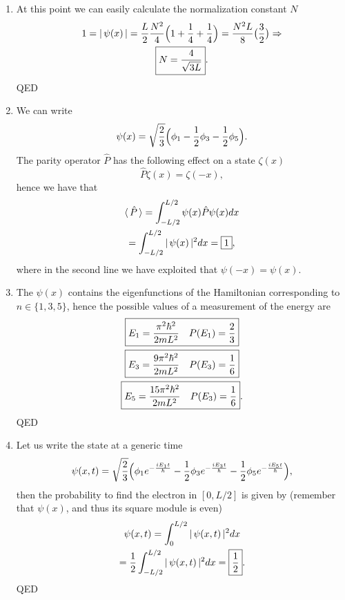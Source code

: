 \begin{enumerate}
    \item At this point we can easily calculate the normalization constant $N$
    \begin{gather}
        1 = |\, \psi (x) \,| = \frac{L}{2} \frac{N^2}{4} \Bigl( 1 + \frac{1}{4} + \frac{1}{4} \Bigr) = \frac{N^2 L}{8} \bigl( \frac{3}{2} \bigr) \Rightarrow \notag \\
        \boxed{N = \frac{4}{\sqrt{3 L}}}.
    \end{gather}
    QED 
    \item We can write 
    \begin{equation}
        \psi (x) = \sqrt{\frac{2}{3}} \Bigl( \phi_1 - \frac{1}{2} \phi_3 - \frac{1}{2} \phi_5 \Bigr).
    \end{equation}
    The parity operator $\hat{P}$ has the following effect on a state $\zeta(x)$
    \begin{equation}
        \hat{P} \zeta(x) = \zeta(-x),
    \end{equation}
    hence we have that
    \begin{gather}
        \langle \, \hat{P} \, \rangle = \int_{-L/2}^{L/2} \psi(x) \hat{P} \psi(x) dx \notag \\
        =  \int_{-L/2}^{L/2} |\, \psi(x) \,|^2 dx = \boxed{1},
    \end{gather}
    where in the second line we have exploited that $\psi(-x) = \psi(x)$.
    \item The $\psi(x)$ contains the eigenfunctions of the Hamiltonian corresponding to $n \in \{ 1, 3, 5 \}$, hence the possible values of a measurement of the energy are 
    \begin{gather*}
        \boxed{E_1 = \frac{\pi^2 \hbar^2}{2 m L^2} \quad P(E_1) = \frac{2}{3}} \\
        \boxed{E_3 = \frac{9 \pi^2 \hbar^2}{2 m L^2} \quad P(E_3) = \frac{1}{6}} \\
        \boxed{E_5 = \frac{15 \pi^2 \hbar^2}{2 m L^2} \quad P(E_3) = \frac{1}{6}}. 
    \end{gather*}
    QED
    \item Let us write the state at a generic time 
    \begin{equation}
        \psi(x, t) = \sqrt{\frac{2}{3}} \Bigl( \phi_1 e^{-\frac{i E_1 t}{\hbar}} - \frac{1}{2} \phi_3 e^{-\frac{i E_3 t}{\hbar}} - \frac{1}{2} \phi_5 e^{-\frac{i E_5 t}{\hbar}} \Bigr),
    \end{equation}
    then the probability to find the electron in $[0, L/2]$ is given by (remember that $\psi(x)$, and thus its square module is even)
    \begin{gather}
        \psi(x, t) = \int_0^{L/2} |\,  \psi(x, t)  \,|^2 dx \notag \\
        = \frac{1}{2} \int_{-L/2}^{L/2} |\,  \psi(x, t)  \,|^2 dx = \boxed{\frac{1}{2}}.
    \end{gather}
    QED
\end{enumerate}
